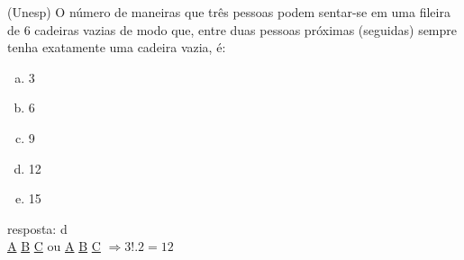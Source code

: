 \begin{ex}
 (Unesp) O número de maneiras que três pessoas podem sentar-se em uma fileira de 6 cadeiras vazias de modo que, entre duas pessoas próximas (seguidas) sempre tenha exatamente uma cadeira vazia, é:
    \begin{enumerate}[(a)]
    \item 3
    \item 6
    \item 9
    \item 12
    \item 15
    \end{enumerate}
      \begin{sol}
        resposta: d \\
        \underline{A}  \underline{\phantom{A}}
        \underline{B}  \underline{\phantom{A}}
        \underline{C}  \underline{\phantom{A}}
        ou \underline{\phantom{A}}  \underline{A}
        \underline{\phantom{A}}  \underline{B}
        \underline{\phantom{A}} \underline{C}
        $\Longrightarrow 3!.2=12$
      \end{sol}
\end{ex}